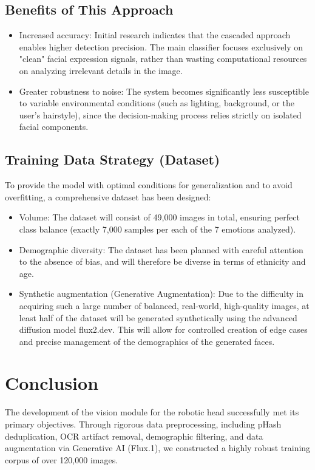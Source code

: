 \documentclass{article}
\begin{document}
\subsection{Benefits of This Approach}
\begin{itemize}
    \item Increased accuracy: Initial research indicates that the cascaded approach enables higher detection precision. The main classifier focuses exclusively on "clean" facial expression signals, rather than wasting computational resources on analyzing irrelevant details in the image.
    \item Greater robustness to noise: The system becomes significantly less susceptible to variable environmental conditions (such as lighting, background, or the user's hairstyle), since the decision-making process relies strictly on isolated facial components.
\end{itemize}

\subsection{Training Data Strategy (Dataset)}
To provide the model with optimal conditions for generalization and to avoid overfitting, a comprehensive dataset has been designed:

\begin{itemize}
    \item Volume: The dataset will consist of 49,000 images in total, ensuring perfect class balance (exactly 7,000 samples per each of the 7 emotions analyzed).
    \item Demographic diversity: The dataset has been planned with careful attention to the absence of bias, and will therefore be diverse in terms of ethnicity and age.
    \item Synthetic augmentation (Generative Augmentation): Due to the difficulty in acquiring such a large number of balanced, real-world, high-quality images, at least half of the dataset will be generated synthetically using the advanced diffusion model flux2.dev. This will allow for controlled creation of edge cases and precise management of the demographics of the generated faces.
\end{itemize}

\section{Conclusion}
The development of the vision module for the robotic head successfully met its primary objectives. Through rigorous data preprocessing, including pHash deduplication, OCR artifact removal, demographic filtering, and data augmentation via Generative AI (Flux.1), we constructed a highly robust training corpus of over 120,000 images.
\end{document}
